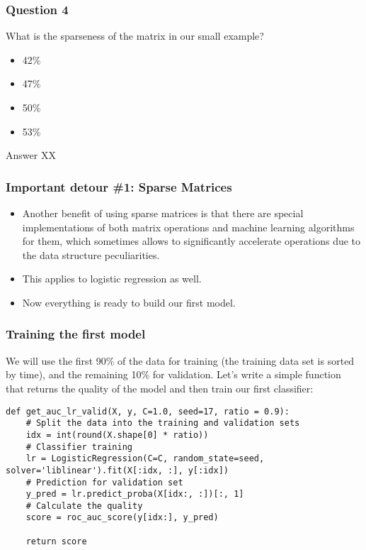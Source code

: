 \begin{frame}[fragile]\frametitle{Question 4}
What is the sparseness of the matrix in our small example?
\begin{itemize}
\item 42\%
\item 47\%
\item 50\%
\item 53\%
\end{itemize}
Answer XX
\end{frame}

\begin{frame}[fragile]\frametitle{Important detour \#1: Sparse Matrices}	
\begin{itemize}
\item Another benefit of using sparse matrices is that there are special implementations of both matrix operations and machine learning algorithms for them, which sometimes allows to significantly accelerate operations due to the data structure peculiarities. 
\item This applies to logistic regression as well. 
\item Now everything is ready to build our first model.
\end{itemize}

\end{frame}

\begin{frame}[fragile]\frametitle{Training the first model}	
We will use the first 90\% of the data for training (the training data set is sorted by time), and the remaining 10\% for validation.  Let's write a simple function that returns the quality of the model and then train our first classifier:

\begin{lstlisting}
def get_auc_lr_valid(X, y, C=1.0, seed=17, ratio = 0.9):
    # Split the data into the training and validation sets
    idx = int(round(X.shape[0] * ratio))
    # Classifier training
    lr = LogisticRegression(C=C, random_state=seed, solver='liblinear').fit(X[:idx, :], y[:idx])
    # Prediction for validation set
    y_pred = lr.predict_proba(X[idx:, :])[:, 1]
    # Calculate the quality
    score = roc_auc_score(y[idx:], y_pred)
    
    return score
\end{lstlisting}
\end{frame}


